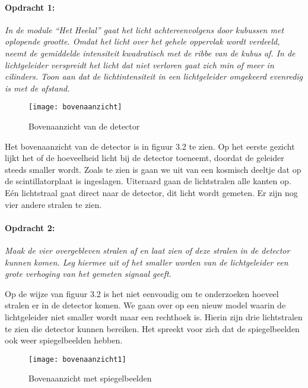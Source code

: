 \paragraph*{Opdracht 1:}

\emph{In de module ``Het Heelal'' gaat het licht achtereenvolgens
door kubussen met oplopende grootte. Omdat het licht over het gehele
oppervlak wordt verdeeld, neemt de gemiddelde intensiteit kwadratisch
met de ribbe van de kubus af. In de lichtgeleider verspreidt het licht
dat niet verloren gaat zich min of meer in cilinders. Toon aan dat
de lichtintensiteit in een lichtgeleider omgekeerd evenredig is met
de afstand.}

\begin{figure}[H]
\noindent \begin{centering}
\texttt{[image: bovenaanzicht]}
\par\end{centering}

\caption{Bovenaanzicht van de detector}
\end{figure}


Het bovenaanzicht van de detector is in figuur 3.2 te zien. Op het
eerste gezicht lijkt het of de hoeveelheid licht bij de detector toeneemt,
doordat de geleider steeds smaller wordt. Zoals te zien is gaan we
uit van een kosmisch deeltje dat op de scintillatorplaat is ingeslagen.
Uiteraard gaan de lichtstralen alle kanten op. Eén lichtstraal gaat
direct naar de detector, dit licht wordt gemeten. Er zijn nog vier
andere stralen te zien.


\paragraph*{Opdracht 2:}

\emph{Maak de vier overgebleven stralen af en laat zien of deze stralen
in de detector kunnen komen. Leg hiermee uit of het smaller worden
van de lichtgeleider een grote verhoging van het gemeten signaal geeft.}

Op de wijze van figuur 3.2 is het niet eenvoudig om te onderzoeken
hoeveel stralen er in de detector komen. We gaan over op een nieuw
model waarin de lichtgeleider niet smaller wordt maar een rechthoek
is. Hierin zijn drie lichtstralen te zien die detector kunnen bereiken.
Het spreekt voor zich dat de spiegelbeelden ook weer spiegelbeelden
hebben.

\begin{figure}[H]
\noindent \begin{centering}
\texttt{[image: bovenaanzicht1]}
\par\end{centering}

\caption{Bovenaanzicht met spiegelbeelden}
\end{figure}



